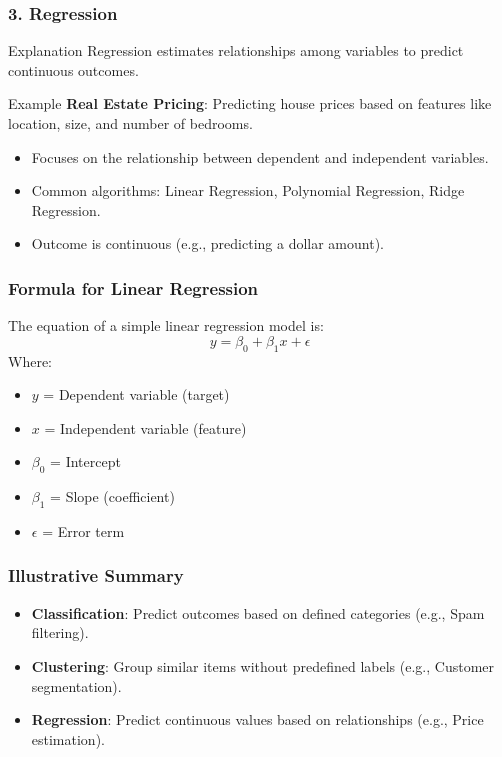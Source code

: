 \documentclass[aspectratio=169]{beamer}
\begin{document}
\begin{frame}[fragile]
    \frametitle{3. Regression}
    \begin{block}{Explanation}
        Regression estimates relationships among variables to predict continuous outcomes.
    \end{block}
    \begin{exampleblock}{Example}
        \textbf{Real Estate Pricing}: Predicting house prices based on features like location, size, and number of bedrooms.
    \end{exampleblock}
    \begin{itemize}
        \item Focuses on the relationship between dependent and independent variables.
        \item Common algorithms: Linear Regression, Polynomial Regression, Ridge Regression.
        \item Outcome is continuous (e.g., predicting a dollar amount).
    \end{itemize}
\end{frame}

\begin{frame}[fragile]
    \frametitle{Formula for Linear Regression}
    The equation of a simple linear regression model is:
    \begin{equation}
        y = \beta_0 + \beta_1 x + \epsilon
    \end{equation}
    Where:
    \begin{itemize}
        \item \( y \) = Dependent variable (target)
        \item \( x \) = Independent variable (feature)
        \item \( \beta_0 \) = Intercept
        \item \( \beta_1 \) = Slope (coefficient)
        \item \( \epsilon \) = Error term
    \end{itemize}
\end{frame}

\begin{frame}[fragile]
    \frametitle{Illustrative Summary}
    \begin{itemize}
        \item \textbf{Classification}: Predict outcomes based on defined categories (e.g., Spam filtering).
        \item \textbf{Clustering}: Group similar items without predefined labels (e.g., Customer segmentation).
        \item \textbf{Regression}: Predict continuous values based on relationships (e.g., Price estimation).
    \end{itemize}
\end{frame}
\end{document}
